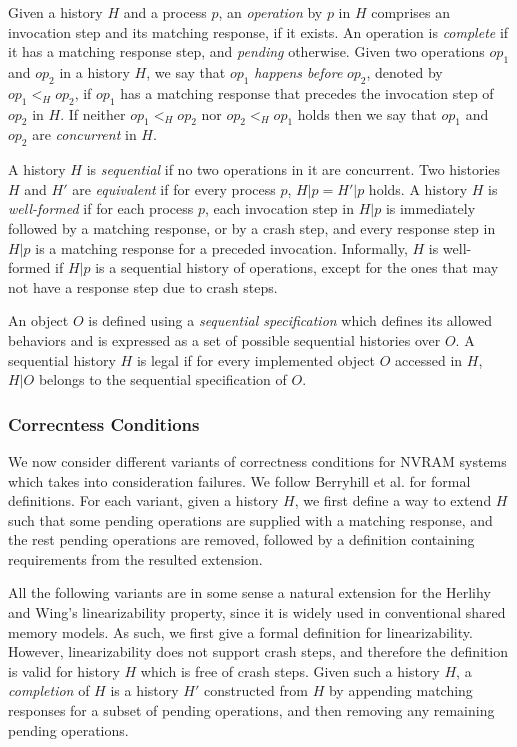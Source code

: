 Given a history $H$ and a process $p$, an \textit{operation} by $p$ in $H$ comprises an invocation step and its matching response, if it exists. An operation is \textit{complete} if it has a matching response step, and \textit{pending} otherwise. Given two operations $op_1$ and $op_2$ in a history $H$, we say that $op_1$ \textit{happens before} $op_2$, denoted by $op_1 <_H op_2$, if $op_1$ has a matching
response that precedes the invocation step of $op_2$ in $H$. If neither $op_1 <_H op_2$ nor $op_2 <_H op_1$ holds then we say that $op_1$ and $op_2$ are \textit{concurrent} in $H$.

A history $H$ is \textit{sequential} if no two operations in it are concurrent. Two histories $H$ and $H'$ are \textit{equivalent} if for every process $p$, $H|p = H'|p$ holds. A history $H$ is \textit{well-formed} if for each process $p$, each invocation step in $H|p$ is immediately followed by a matching response, or by a crash step, and every response step in $H|p$ is a matching response for a preceded invocation. Informally, $H$ is well-formed if $H|p$ is a sequential history of operations, except for the ones that may not have a response step due to crash steps.

An object $O$ is defined using a \textit{sequential specification} which defines its allowed behaviors and is expressed as a set of possible sequential histories over $O$. A sequential history $H$ is legal if for every implemented object $O$ accessed in $H$, $H|O$ belongs to the sequential specification of $O$.


\subsubsection{Correcntess Conditions}
We now consider different variants of correctness conditions for NVRAM systems which takes into consideration failures. We follow Berryhill et al. \cite{DBLP:conf/opodis/BerryhillGT15} for formal definitions. For each variant, given a history $H$, we first define a way to extend $H$ such that some pending operations are supplied with a matching response, and the rest pending operations are removed, followed by a definition containing requirements from the resulted extension.

All the following variants are in some sense a natural extension for the Herlihy and Wing's linearizability property, since it is widely used in conventional shared memory models. As such, we first give a formal definition for linearizability. However, linearizability does not support crash steps, and therefore the definition is valid for history $H$ which is free of crash steps. Given such a history $H$, a \textit{completion} of $H$ is a history $H'$ constructed from $H$ by appending matching responses for a subset of pending operations, and then removing any remaining pending operations.

